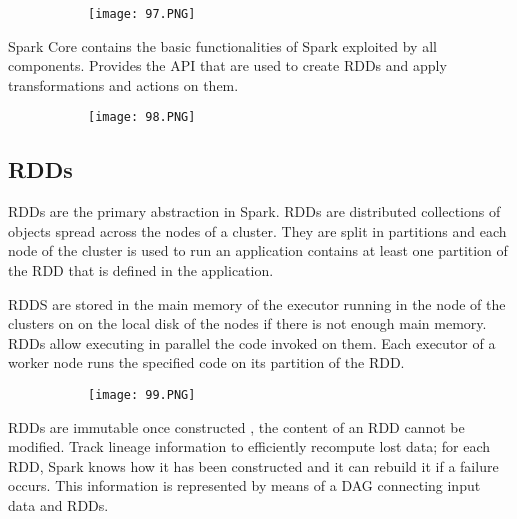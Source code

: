 \documentclass{article}
\begin{document}
\begin{figure}[ht!]
  \centering
  \begin{subfigure}[b]{0.3\linewidth}
    \texttt{[image: 97.PNG]}
  \end{subfigure}
\end{figure}

Spark Core contains the basic functionalities of Spark exploited by all components. Provides the API that are used to create RDDs and apply transformations and actions on them.

\begin{figure}[ht!]
  \centering
  \begin{subfigure}[b]{0.3\linewidth}
    \texttt{[image: 98.PNG]}
  \end{subfigure}
\end{figure}

\subsection{RDDs}

RDDs are the primary abstraction in Spark.
RDDs are distributed collections of objects spread across the nodes of a cluster. 
They are split in partitions and each node of the cluster is used to run an application contains at least one partition of the RDD that is defined in the application.

RDDS are stored in the main memory of the executor running in the node of the clusters on on the local disk of the nodes if there is not enough main memory.
RDDs allow executing in parallel the code invoked on them. Each executor of a worker node runs the specified code on its partition of the RDD.

\begin{figure}[ht!]
  \centering
  \begin{subfigure}[b]{0.5\linewidth}
    \texttt{[image: 99.PNG]}
  \end{subfigure}
\end{figure}

RDDs are immutable once constructed , the content of an RDD cannot be modified.
Track lineage information to efficiently recompute lost data; for each RDD, Spark knows how it has been constructed and it can rebuild it if a failure occurs.
This information is represented by means of a DAG connecting input data and RDDs.


\vspace{10mm}
\end{document}
